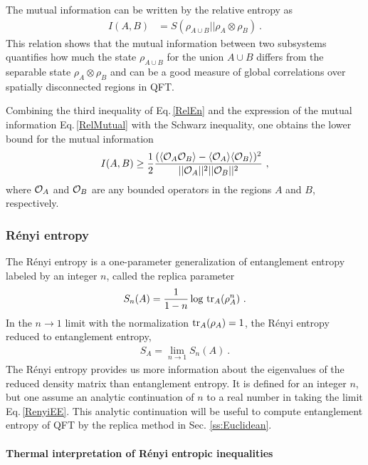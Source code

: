 The mutual information can be written by the relative entropy as
\begin{align}\label{RelMutual}
	 I(A,B) &= S(\rho_{A\cup B} || \rho_A \otimes \rho_B)\ .
\end{align}
This relation shows that the mutual information between two subsystems quantifies how much 
the state $\rho_{A\cup B}$ for the union $A\cup B$ differs from the separable state $\rho_A \otimes \rho_B$ and can be a good measure of global correlations over spatially disconnected regions in QFT.

Combining the third inequality of Eq.\,\eqref{RelEn} and the expression of the mutual information Eq.\,\eqref{RelMutual} with the Schwarz inequality,
one obtains the lower bound for the mutual information \cite{wolf2008area}
\begin{align}
I(A, B) \ge \frac{1}{2} \frac{( \langle {\cal O}_A {\cal O}_B \rangle - \langle {\cal O}_A \rangle \langle {\cal O}_B \rangle)^2}{|| {\cal O}_A ||^2 || {\cal O}_B||^2} \ ,
\end{align}
where ${\cal O}_A$ and ${\cal O}_B$ are any bounded operators in the regions $A$ and $B$, respectively.



\subsubsection{R{\'e}nyi entropy}
The R{\'e}nyi entropy is a one-parameter generalization of entanglement entropy labeled by an integer $n$, called the replica parameter \cite{rrnyi1961measures}
\begin{align}\label{RenyiDef}
S_n (A) = \frac{1}{1-n} \log\, {\rm tr}_A ( \rho_A^n) \ .
\end{align}
In the $n\to 1$ limit with the normalization ${\rm tr}_A( \rho_A) = 1$, the R{\'e}nyi entropy reduced to entanglement entropy,
\begin{align}\label{RenyiEE}
S_A = \lim_{n\to 1} S_n(A) \ .
\end{align}
The R{\'e}nyi entropy provides us more information about the eigenvalues of the reduced density matrix than entanglement entropy.
It is defined for an integer $n$, but one assume an analytic continuation of $n$ to a real number in taking the limit Eq.\,\eqref{RenyiEE}.
This analytic continuation will be useful to compute entanglement entropy of QFT by the replica method in Sec. \ref{ss:Euclidean}.


\paragraph{Thermal interpretation of R{\'e}nyi entropic inequalities}

